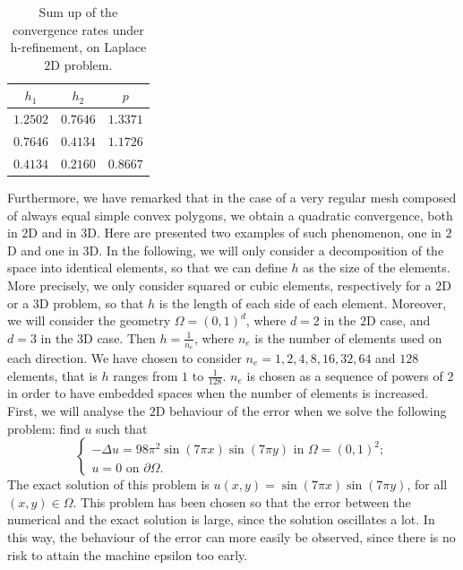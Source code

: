 \begin{table}[h!]
\begin{center}
\begin{tabular}{|c|c|c|}
\hline
$h_1$ & $h_2$ & $p$ \\
\hline
$1.2502$ & $0.7646$ & $1.3371$\\
\hline
$0.7646$ & $0.4134$ & $1.1726$\\
\hline
$0.4134$ & $0.2160$ & $0.8667$\\
\hline
\end{tabular}
\end{center}
\caption{Sum up of the convergence rates under h-refinement, on Laplace $2$D problem.} \label{tableSphere}
\end{table}

Furthermore, we have remarked that in the case of a very regular mesh composed of always equal simple convex polygons, we obtain a quadratic convergence, both in $2$D and in $3$D. Here are presented two examples of such phenomenon, one in $2$D and one in $3$D. 
In the following, we will only consider a decomposition of the space into identical elements, so
that we can define $h$ as the size of the elements. More precisely, we only consider squared or cubic elements, respectively for a $2$D or a $3$D problem, so that $h$ is the length of each side of each element.
Moreover, we will consider the geometry $\Omega=(0,1)^d$, where $d=2$ in the $2$D case, and $d=3$ in the $3$D case. Then $h=\frac{1}{n_e}$, where $n_e$ is the number of elements used on each direction. We have chosen to consider $n_e=1, 2, 4, 8, 16, 32, 64$ and $128$ elements, that is $h$ ranges from $1$ to $\frac{1}{128}$. $n_e$ is chosen as a sequence of powers of $2$ in order to have embedded spaces when the number of elements is increased.\\

First, we will analyse the $2$D behaviour of the error when we solve the following problem: find $u$ such that
\begin{equation*}
\begin{cases}
-\Delta u = 98\pi^2\sin(7\pi x)\sin(7\pi y) \text{ in } \Omega = (0,1)^2;\\
u = 0 \text{ on } \partial \Omega.
\end{cases}
\end{equation*}
The exact solution of this problem is $u(x,y)=\sin(7\pi x)\sin(7\pi y)$, for all $(x,y)\in \Omega$. This problem has been chosen so that the error between the numerical and the exact solution is large, since the solution oscillates a lot. In this way, the behaviour of the error can more easily be observed, since there is no risk to attain the machine epsilon too early. \\

